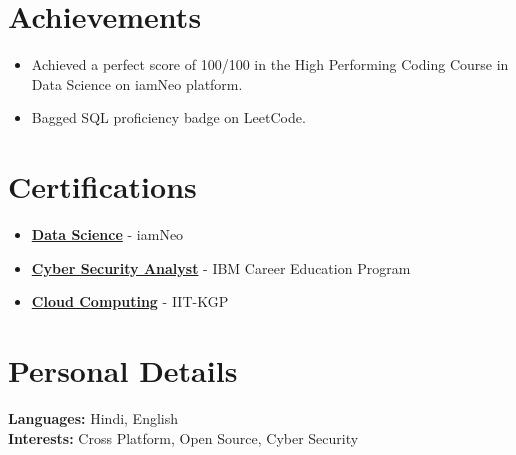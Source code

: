 \documentclass[a4paper,10pt]{article}
\begin{document}
\vspace{-4pt}
\section{Achievements}
\begin{itemize}
  \setlength{\itemsep}{2pt}   %
  \setlength{\parskip}{0pt}
  \setlength{\parsep}{0pt}
  \item Achieved a perfect score of 100/100 in the High Performing Coding Course in Data Science on iamNeo platform.
  \item Bagged SQL proficiency badge on LeetCode.
\end{itemize}


\vspace{-4pt}
\section{Certifications}
  \begin{itemize}
  \setlength{\itemsep}{2pt}   %
  \setlength{\parskip}{0pt}
  \setlength{\parsep}{0pt}
    \item \href{https://drive.google.com/file/d/13OnJ0YanOgAibcNiZ2WBm113PqxVS4Ie/view?usp=sharing}{\textbf{Data Science}} - iamNeo 
    \item \href{https://courses.ibmcep.cognitiveclass.ai/certificates/c193fe199bc94fb79aa6c794c9fa4cbe}{\textbf{Cyber Security Analyst}} - IBM Career Education Program 
    \item \href{https://archive.nptel.ac.in/content/noc/NOC24/SEM1/Ecertificates/106/noc24-cs17/Course/NPTEL24CS17S35290010730645933.pdf}{\textbf{Cloud Computing}} - IIT-KGP
\end{itemize}


\vspace{-4pt}
\section{Personal Details}
\hspace{1.5em}
\begin{flushleft}
  \textbf{Languages:} Hindi, English \\[4pt]
  \textbf{Interests:} Cross Platform, Open Source, Cyber Security
\end{flushleft}
\end{document}
